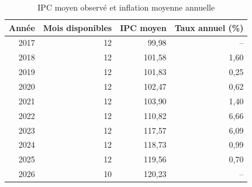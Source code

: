 \begin{table}[!htbp]
\centering\small
\caption{IPC moyen observé et inflation moyenne annuelle}\label{tab:annuel}
\begin{tabular}{rrrr}
\hline
Année & Mois disponibles & IPC moyen & Taux annuel (\%) \\
\hline
2017 & 12 & 99{,}98 & -- \\
2018 & 12 & 101{,}58 & 1{,}60 \\
2019 & 12 & 101{,}83 & 0{,}25 \\
2020 & 12 & 102{,}47 & 0{,}62 \\
2021 & 12 & 103{,}90 & 1{,}40 \\
2022 & 12 & 110{,}82 & 6{,}66 \\
2023 & 12 & 117{,}57 & 6{,}09 \\
2024 & 12 & 118{,}73 & 0{,}99 \\
2025 & 12 & 119{,}56 & 0{,}70 \\
2026 & 10 & 120{,}23 & -- \\
\hline
\end{tabular}
\end{table}
